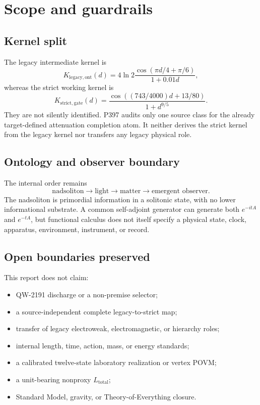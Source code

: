 \documentclass[11pt,a4paper,openany]{report}
\begin{document}
\chapter{Scope and guardrails}

\section{Kernel split}

The legacy intermediate kernel is
\[
K_{\mathrm{legacy,ont}}(d)
=4\ln2\frac{\cos(\pi d/4+\pi/6)}{1+0.01d},
\]
whereas the strict working kernel is
\[
K_{\mathrm{strict,gate}}(d)
=\frac{\cos((743/4000)d+13/80)}{1+d^{9/5}}.
\]
They are not silently identified. P397 audits only one source class for the
already target-defined attenuation completion atom. It neither derives the
strict kernel from the legacy kernel nor transfers any legacy physical role.

\section{Ontology and observer boundary}

The internal order remains
\[
\text{nadsoliton}\longrightarrow\text{light}\longrightarrow\text{matter}
\longrightarrow\text{emergent observer}.
\]
The nadsoliton is primordial information in a solitonic state, with no lower
informational substrate. A common self-adjoint generator can generate both
$e^{-itA}$ and $e^{-tA}$, but functional calculus does not itself specify a
physical state, clock, apparatus, environment, instrument, or record.

\section{Open boundaries preserved}

This report does not claim:
\begin{itemize}
\item QW-2191 discharge or a non-premise selector;
\item a source-independent complete legacy-to-strict map;
\item transfer of legacy electroweak, electromagnetic, or hierarchy roles;
\item internal length, time, action, mass, or energy standards;
\item a calibrated twelve-state laboratory realization or vertex POVM;
\item a unit-bearing nonproxy $L_{\mathrm{total}}$;
\item Standard Model, gravity, or Theory-of-Everything closure.
\end{itemize}
\end{document}
